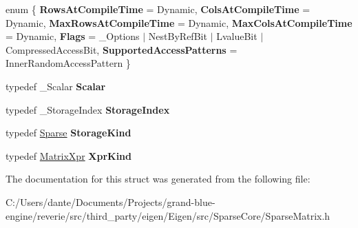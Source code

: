 \begin{DoxyCompactItemize}
\item 
\mbox{\label{struct_eigen_1_1internal_1_1traits_3_01_sparse_matrix_3_01___scalar_00_01___options_00_01___storage_index_01_4_01_4_a2bb8974787200b7fb4ab1e55404afe7a}} 
enum \{ \newline
{\bfseries Rows\+At\+Compile\+Time} = Dynamic, 
{\bfseries Cols\+At\+Compile\+Time} = Dynamic, 
{\bfseries Max\+Rows\+At\+Compile\+Time} = Dynamic, 
{\bfseries Max\+Cols\+At\+Compile\+Time} = Dynamic, 
\newline
{\bfseries Flags} = \+\_\+\+Options $\vert$ Nest\+By\+Ref\+Bit $\vert$ Lvalue\+Bit $\vert$ Compressed\+Access\+Bit, 
{\bfseries Supported\+Access\+Patterns} = Inner\+Random\+Access\+Pattern
 \}
\item 
\mbox{\label{struct_eigen_1_1internal_1_1traits_3_01_sparse_matrix_3_01___scalar_00_01___options_00_01___storage_index_01_4_01_4_ad0e6647374d156a8f13a326947066e6a}} 
typedef \+\_\+\+Scalar {\bfseries Scalar}
\item 
\mbox{\label{struct_eigen_1_1internal_1_1traits_3_01_sparse_matrix_3_01___scalar_00_01___options_00_01___storage_index_01_4_01_4_a02b08163915b463d17c6eeee4fca6ca6}} 
typedef \+\_\+\+Storage\+Index {\bfseries Storage\+Index}
\item 
\mbox{\label{struct_eigen_1_1internal_1_1traits_3_01_sparse_matrix_3_01___scalar_00_01___options_00_01___storage_index_01_4_01_4_a5388c5f0de00d87f5fedd6f85122bc30}} 
typedef \mbox{\hyperlink{struct_eigen_1_1_sparse}{Sparse}} {\bfseries Storage\+Kind}
\item 
\mbox{\label{struct_eigen_1_1internal_1_1traits_3_01_sparse_matrix_3_01___scalar_00_01___options_00_01___storage_index_01_4_01_4_a88307dba135b80c0d5008b6e532d3f2b}} 
typedef \mbox{\hyperlink{struct_eigen_1_1_matrix_xpr}{Matrix\+Xpr}} {\bfseries Xpr\+Kind}
\end{DoxyCompactItemize}


The documentation for this struct was generated from the following file\+:\begin{DoxyCompactItemize}
\item 
C\+:/\+Users/dante/\+Documents/\+Projects/grand-\/blue-\/engine/reverie/src/third\+\_\+party/eigen/\+Eigen/src/\+Sparse\+Core/Sparse\+Matrix.\+h\end{DoxyCompactItemize}
